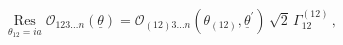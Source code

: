 \begin{equation}
\operatorname*{Res}_{\theta_{12}=ia}\mathcal{O}_{123\dots n}(\underline
{\theta})=\mathcal{O}_{(12)3\dots n}(\theta_{(12)},\underline{\theta}^{\prime
})\,\sqrt{2}\,\Gamma_{12}^{(12)}\,,\label{pf4}%
\end{equation}

